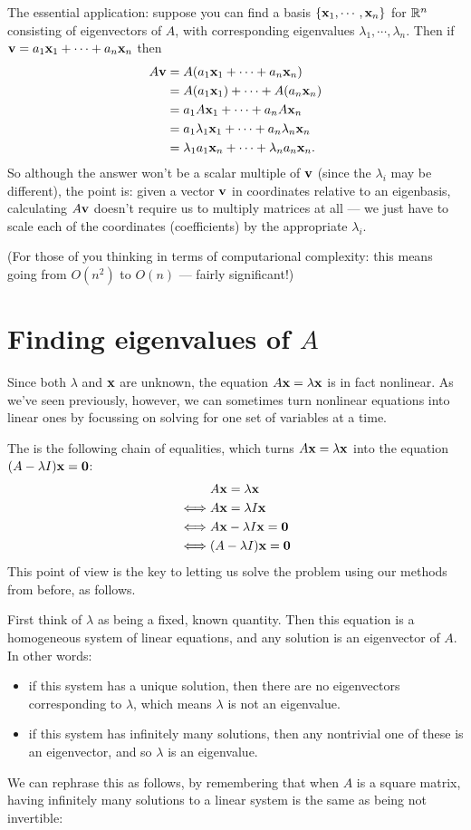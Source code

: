 The essential application:  
suppose you can find a basis  $\{ \mathbf{x}_1,\cdots,\mathbf{x}_n\}$  for $\mathbb{R}^n$ consisting of
eigenvectors of $A$, with corresponding eigenvalues $\lambda_1,\cdots, \lambda_n$.
Then if $\mathbf{v} = a_1 \mathbf{x}_1 + \cdots + a_n \mathbf{x}_n$
then
\begin{align*}
A\mathbf{v} &= A(a_1 \mathbf{x}_1 + \cdots + a_n \mathbf{x}_n)\\
 &= A(a_1 \mathbf{x}_1) + \cdots + A( a_n \mathbf{x}_n)\\
&= a_1 A\mathbf{x}_1 + \cdots + a_n A\mathbf{x}_n\\
&= a_1\lambda_1 \mathbf{x}_1 + \cdots + a_n\lambda_n \mathbf{x}_n\\
&= \lambda_1a_1\mathbf{x}_n + \cdots + \lambda_na_n\mathbf{x}_n.
\end{align*}
So although the answer won't be a scalar multiple of $\mathbf{v}$ (since the
$\lambda_i$ may be different), the point
is:  given a vector $\mathbf{v}$ in coordinates relative to an eigenbasis, calculating
$A\mathbf{v}$ doesn't require us to multiply matrices at all --- we just have to
scale each of the coordinates (coefficients) by the appropriate $\lambda_i$.

(For those of you thinking in terms of computarional complexity:  this means
going from $O(n^2)$ to $O(n)$ --- fairly significant!)


\section{Finding eigenvalues of $A$}

Since both $\lambda$ and $\mathbf{x}$ are unknown, the equation $A\mathbf{x} = \lambda \mathbf{x}$ is
in fact nonlinear.  As we've seen previously, however, we can sometimes 
turn nonlinear equations into linear ones by focussing on solving for
one set of variables at a time.

The  is the following chain of equalities, which
turns $A\mathbf{x} = \lambda \mathbf{x}$ into the equation $( A- \lambda I) \mathbf{x} = \mathbf{0}$:
\begin{align*}
& A\mathbf{x} = \lambda \mathbf{x} \\
\iff & A\mathbf{x} = \lambda I \mathbf{x}\\
\iff & A\mathbf{x} - \lambda I \mathbf{x} =\mathbf{0}  \\
\iff & (A-\lambda I )\mathbf{x}=\mathbf{0}  
\end{align*}
This point of view is the key to letting us solve the problem using
our methods from before, as follows.

First think of $\lambda$ as being a fixed, known quantity.  Then
this equation is a homogeneous system of linear equations, and
any  solution is an eigenvector of $A$.  In
other words:  
\begin{itemize}
\item if this system has a unique solution, then there
are no eigenvectors corresponding to $\lambda$, which means
$\lambda$ is not an eigenvalue.
\item if this system has infinitely many solutions, then any nontrivial
one of these is an eigenvector, and so $\lambda$ is an eigenvalue.
\end{itemize}
We can rephrase this as follows, by remembering that when $A$ is
a square matrix, having infinitely many solutions to a linear
system is the same as being not invertible:

